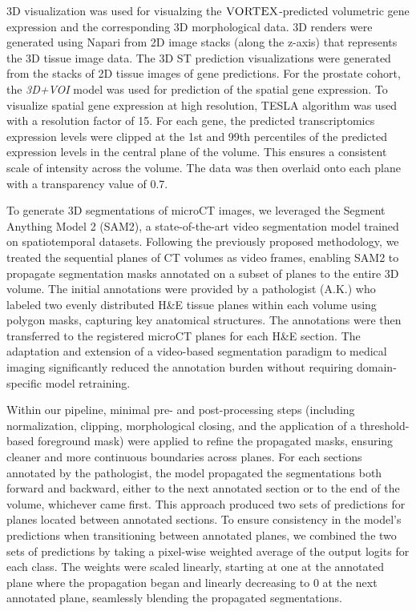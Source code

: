 
3D visualization was used for visualzing the $\textsc{VORTEX}$-predicted volumetric gene expression and the corresponding 3D morphological data. 3D renders were generated using Napari from 2D image stacks (along the z-axis) that represents the 3D tissue image data. 
The 3D ST prediction visualizations were generated from the stacks of 2D tissue images of gene predictions. For the prostate cohort, the \textit{3D+VOI} model was used for prediction of the spatial gene expression. 
To visualize spatial gene expression at high resolution, TESLA algorithm was used with a resolution factor of 15\cite{hu2023deciphering}. For each gene, the predicted transcriptomics expression levels were clipped at the 1st and 99th percentiles of the predicted expression levels in the central plane of the volume. This ensures a consistent scale of intensity across the volume. The data was then overlaid onto each plane with a transparency value of 0.7.


To generate 3D segmentations of microCT images, we leveraged the Segment Anything Model 2 (SAM2), a state-of-the-art video segmentation model trained on spatiotemporal datasets\cite{ravi2024sam2segmentimages}. Following the previously proposed methodology\cite{shen2024interactive3dmedicalimage}, we treated the sequential planes of CT volumes as video frames, enabling SAM2 to propagate segmentation masks annotated on a subset of planes to the entire 3D volume. The initial annotations were provided by a pathologist (A.K.) who labeled two evenly distributed H\&E tissue planes within each volume using polygon masks, capturing key anatomical structures. The annotations were then transferred to the registered microCT planes for each H\&E section. The adaptation and extension of a video-based segmentation paradigm to medical imaging significantly reduced the annotation burden without requiring domain-specific model retraining.

Within our pipeline, minimal pre- and post-processing steps (including normalization, clipping, morphological closing, and the application of a threshold-based foreground mask) were applied to refine the propagated masks, ensuring cleaner and more continuous boundaries across planes. For each sections annotated by the pathologist, the model propagated the segmentations both forward and backward, either to the next annotated section or to the end of the volume, whichever came first. This approach produced two sets of predictions for planes located between annotated sections. To ensure consistency in the model’s predictions when transitioning between annotated planes, we combined the two sets of predictions by taking a pixel-wise weighted average of the output logits for each class. The weights were scaled linearly, starting at one at the annotated plane where the propagation began and linearly decreasing to 0 at the next annotated plane, seamlessly blending the propagated segmentations.


